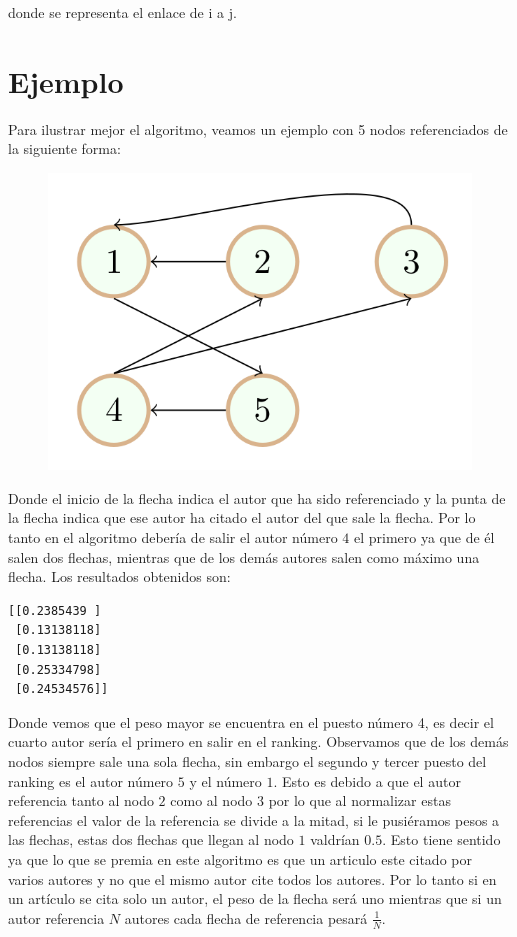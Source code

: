 \documentclass[size=a4, parskip=half, titlepage=false, toc=flat, toc=bib, 12pt]{scrartcl}
\theoremstyle{theorem-style}
\theoremstyle{definition-style}
\theoremstyle{remark-style}
\theoremstyle{example-style}
\theoremstyle{definition-style}
\theoremstyle{remark-style}
\begin{document}
donde se representa el enlace de i a j.


\section{Ejemplo}
Para ilustrar mejor el algoritmo, veamos un ejemplo con 5 nodos referenciados de la siguiente forma:

\begin{figure}[H]
\centering
\includegraphics[scale=0.5]{./img/grafoejemplo}
\end{figure}
Donde el inicio de la flecha indica el autor que ha sido referenciado y la punta de la flecha indica
que ese autor ha citado el autor del que sale la flecha. Por lo tanto en el algoritmo debería de salir
el autor número $4$ el primero ya que de él salen dos flechas, mientras que de los demás autores salen
como máximo una flecha. Los resultados obtenidos son:

\begin{verbatim}
[[0.2385439 ]
 [0.13138118]
 [0.13138118]
 [0.25334798]
 [0.24534576]]
\end{verbatim}

Donde vemos que el peso mayor se encuentra en el puesto número 4, es decir el cuarto autor sería el
primero en salir en el ranking. Observamos que de los demás nodos siempre sale una sola flecha, sin
embargo el segundo y tercer puesto del ranking es el autor número $5$ y el número $1$. Esto es debido
a que el autor referencia tanto al nodo $2$ como al nodo $3$ por lo que al normalizar estas
referencias el valor de la referencia se divide a la mitad, si le pusiéramos pesos a las flechas,
estas dos flechas que llegan al nodo $1$ valdrían $0.5$. Esto tiene sentido ya que lo que se premia
en este algoritmo es que un articulo este citado por varios autores y no que el mismo autor cite todos
los autores. Por lo tanto si en un artículo se cita solo un autor, el peso de la flecha será uno
mientras que si un autor referencia $N$ autores cada flecha de referencia pesará $\frac{1}{N}$.
\end{document}
